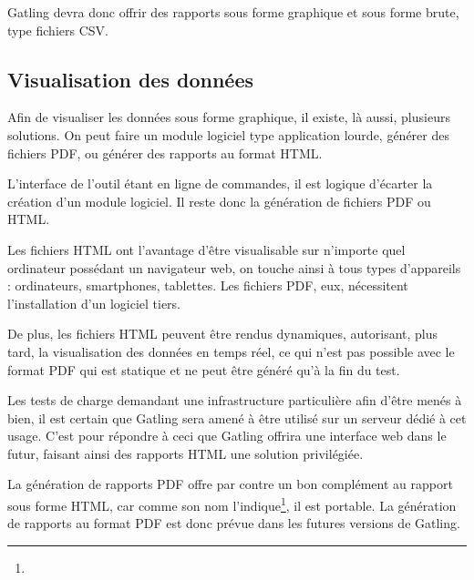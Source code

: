 Gatling devra donc offrir des rapports sous forme graphique et sous forme brute, type fichiers CSV.

\subsection{Visualisation des données}

Afin de visualiser les données sous forme graphique, il existe, là aussi, plusieurs solutions. On peut faire un module logiciel type application lourde, générer des fichiers PDF, ou générer des rapports au format HTML. 

L'interface de l'outil étant en ligne de commandes, il est logique d'écarter la création d'un module logiciel. Il reste donc la génération de fichiers PDF ou HTML.

Les fichiers HTML ont l'avantage d'être visualisable sur n'importe quel ordinateur possédant un navigateur web, on touche ainsi à tous types d'appareils : ordinateurs, smartphones, tablettes. Les fichiers PDF, eux, nécessitent l'installation d'un logiciel tiers.

De plus, les fichiers HTML peuvent être rendus dynamiques, autorisant, plus tard, la visualisation des données en temps réel, ce qui n'est pas possible avec le format PDF qui est statique et ne peut être généré qu'à la fin du test.

Les tests de charge demandant une infrastructure particulière afin d'être menés à bien, il est certain que Gatling sera amené à être utilisé sur un serveur dédié à cet usage. C'est pour répondre à ceci que Gatling offrira une interface web dans le futur, faisant ainsi des rapports HTML une solution privilégiée.

La génération de rapports PDF offre par contre un bon complément au rapport sous forme HTML, car comme son nom l'indique\footnote{}, il est portable. La génération de rapports au format PDF est donc prévue dans les futures versions de Gatling. 